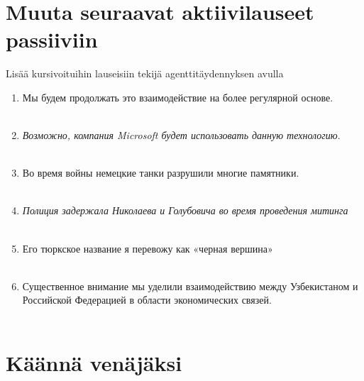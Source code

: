 \documentclass[paper=a4, fontsize=11pt]{scrartcl}
\begin{document}
\section{Muuta seuraavat aktiivilauseet passiiviin}

Lisää kursivoituihin lauseisiin tekijä agenttitäydennyksen avulla

\begin{enumerate}
    \item Мы будем продолжать это взаимодействие на более регулярной основе. \\
            \underline{\hspace{14cm}} \\
        \item \emph{Возможно, компания Microsoft будет использовать данную технологию}. \\
            \underline{\hspace{14cm}} \\
    \item Во время войны немецкие танки разрушили многие памятники. \\
            \underline{\hspace{14cm}} \\
        \item \emph{Полиция задержала Николаева и Голубовича во время проведения митинга} \\
            \underline{\hspace{14cm}} \\
    \item Его тюркское название я перевожу как «черная вершина» \\
            \underline{\hspace{14cm}} \\
    \item  Существенное внимание мы уделили взаимодействию между Узбекистаном и Российской Федерацией в области экономических связей. \\
            \underline{\hspace{14cm}} \\
\end{enumerate}

\section{Käännä venäjäksi}
\end{document}
